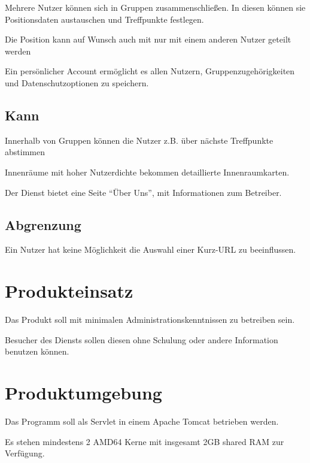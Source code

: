 \documentclass[parskip=full,11pt,twoside]{scrartcl}
\begin{document}
Mehrere Nutzer können sich in Gruppen zusammenschließen. In diesen
können sie Positionsdaten austauschen und Treffpunkte festlegen.

Die Position kann auf Wunsch auch mit nur mit einem anderen Nutzer geteilt werden

Ein persönlicher Account ermöglicht es allen Nutzern,
Gruppenzugehörigkeiten und Datenschutzoptionen zu speichern.

\subsection{Kann}

Innerhalb von Gruppen können die Nutzer z.B. über nächste Treffpunkte abstimmen

Innenräume mit hoher Nutzerdichte bekommen detaillierte Innenraumkarten.

Der Dienst bietet eine Seite \enquote{Über Uns},
mit Informationen zum Betreiber.

\subsection{Abgrenzung}

Ein Nutzer hat keine Möglichkeit die Auswahl einer Kurz-URL zu beeinflussen.

\pagebreak
\section{Produkteinsatz}

Das Produkt soll mit minimalen Administrationskenntnissen zu betreiben sein.

Besucher des Diensts sollen diesen ohne Schulung oder andere Information benutzen können.

\section{Produktumgebung}

Das Programm soll als Servlet in einem Apache Tomcat betrieben werden.

Es stehen mindestens 2 AMD64 Kerne mit insgesamt 2GB shared RAM zur Verfügung.
\end{document}

